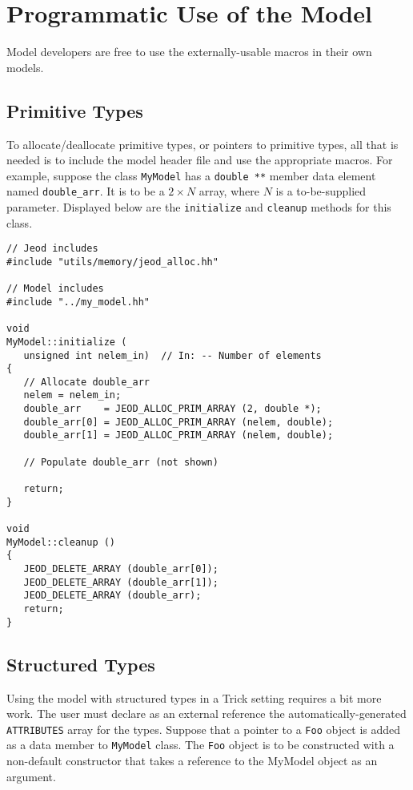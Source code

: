 \section{Programmatic Use of the Model}
Model developers are free to use the externally-usable macros in their own
models.

\subsection{Primitive Types}
To allocate/deallocate primitive types, or pointers to primitive types,
all that is needed is to include the model header file and use the appropriate
macros. For example, suppose the class {\tt MyModel} has a {\tt double **}
member data element named {\tt double\_arr}. It is to be a $2\times N$ array,
where $N$ is a to-be-supplied parameter. Displayed below are the
{\tt initialize} and {\tt cleanup} methods for this class.


\begin{verbatim}
// Jeod includes
#include "utils/memory/jeod_alloc.hh"

// Model includes
#include "../my_model.hh"

void
MyModel::initialize (
   unsigned int nelem_in)  // In: -- Number of elements
{
   // Allocate double_arr
   nelem = nelem_in;
   double_arr    = JEOD_ALLOC_PRIM_ARRAY (2, double *);
   double_arr[0] = JEOD_ALLOC_PRIM_ARRAY (nelem, double);
   double_arr[1] = JEOD_ALLOC_PRIM_ARRAY (nelem, double);
   
   // Populate double_arr (not shown)

   return;
}

void
MyModel::cleanup ()
{
   JEOD_DELETE_ARRAY (double_arr[0]);
   JEOD_DELETE_ARRAY (double_arr[1]);
   JEOD_DELETE_ARRAY (double_arr);
   return;
}
\end{verbatim}


\subsection{Structured Types}
Using the model with structured types in a Trick setting requires a
bit more work. The user must declare as an external reference the
automatically-generated {\tt ATTRIBUTES} array for the types.
Suppose that a pointer to a {\tt Foo} object is added as a data
member to {\tt MyModel} class. The {\tt Foo} object is to be constructed
with a non-default constructor that takes a reference to the MyModel object
as an argument.

